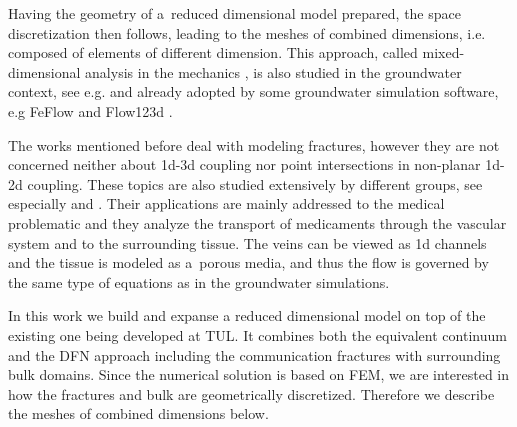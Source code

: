 Having the geometry of a~reduced dimensional model prepared, the space discretization then follows,
leading to the meshes of combined dimensions, i.e. composed of elements of different dimension.
This approach, called mixed-dimensional analysis in the mechanics \cite{bournival_mesh-geometry_2008},
is also studied in the groundwater context, see e.g.
\cite{martin_modeling_2005, fumagalli_numerical_2011, dangelo_mixed_2012, pichot_generalized_2012, brezina_analysis_2015}
and already adopted by some groundwater simulation software, e.g FeFlow \cite{trefry_feflow_2007} and Flow123d \cite{flow123d}.

The works mentioned before deal with modeling fractures, however they are not concerned neither about 1d-3d coupling
nor point intersections in non-planar 1d-2d coupling. These topics are also studied extensively by different groups, see
especially \cite{dangelo_coupling_2008, cattaneo_numerical_2015} and \cite{koppl_tum_2015, koppl_vidotto_2018}.
Their applications are mainly addressed to the medical problematic and they analyze the transport of medicaments through
the vascular system and to the surrounding tissue. The veins can be viewed as 1d channels and the tissue is modeled as a~porous media,
and thus the flow is governed by the same type of equations as in the groundwater simulations.

In this work we build and expanse a reduced dimensional model on top of the existing one being developed at TUL.
It combines both the equivalent continuum and the DFN approach including the communication fractures with surrounding bulk domains.
Since the numerical solution is based on FEM, we are interested in how the fractures and bulk are geometrically discretized.
Therefore we describe the meshes of combined dimensions below.



